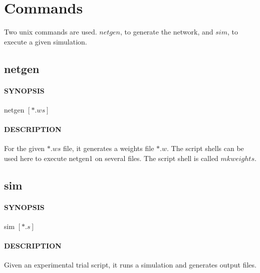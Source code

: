 \documentclass[12pt]{article}
\begin{document}
\section{Commands}
Two unix commands are used. $netgen$, to generate the network, and
$sim$, to execute a given simulation.

\subsection{netgen}
\paragraph{SYNOPSIS} netgen $[*.ws]$
\paragraph{DESCRIPTION} For the given $*.ws$ file, it generates a
weights file $*.w$. The script shells can be used here to execute
netgen1 on several files. The script shell is called $mkweights$.

\subsection{sim}
\paragraph{SYNOPSIS} sim $[*.s]$
\paragraph{DESCRIPTION} Given an experimental trial script, it runs
a simulation and generates output files.

\end{document}
